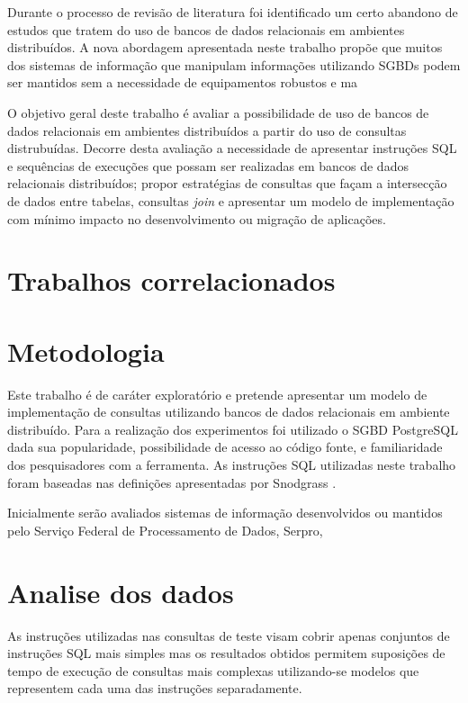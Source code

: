 \documentclass[12pt, a4paper]{article}
\begin{document}
Durante o processo de revisão de literatura foi identificado um certo abandono de estudos que tratem
do uso de bancos de dados relacionais em ambientes distribuídos. A nova abordagem apresentada neste
trabalho propõe que muitos dos sistemas de informação que manipulam informações utilizando SGBDs podem
ser mantidos sem a necessidade de equipamentos robustos e ma

O objetivo geral deste trabalho é avaliar a possibilidade de uso de bancos de dados relacionais em ambientes distribuídos a 
partir do uso de consultas distrubuídas. Decorre desta avaliação a necessidade de apresentar instruções SQL e 
sequências de execuções que possam ser realizadas em bancos de dados relacionais distribuídos; propor estratégias 
de consultas que façam a intersecção de dados entre tabelas, consultas \textit{join} e apresentar
um modelo de implementação com mínimo impacto no desenvolvimento ou migração de aplicações.



\section{Trabalhos correlacionados}

\section{Metodologia}

Este trabalho é de caráter exploratório e pretende apresentar um modelo de implementação de consultas
utilizando bancos de dados relacionais em ambiente distribuído. Para a realização dos experimentos
foi utilizado o SGBD PostgreSQL dada sua popularidade, possibilidade de acesso ao código fonte, e 
familiaridade dos pesquisadores com a ferramenta. As instruções SQL utilizadas neste trabalho foram
baseadas nas definições apresentadas por Snodgrass \cite{snodgrass1994tsql2}.

Inicialmente serão avaliados sistemas de informação desenvolvidos ou mantidos pelo Serviço Federal de
Processamento de Dados, Serpro, 



\section{Analise dos dados}

As instruções utilizadas nas consultas de teste visam cobrir apenas conjuntos de instruções SQL mais simples
mas os resultados obtidos permitem suposições de tempo de execução de consultas mais complexas utilizando-se
modelos que representem cada uma das instruções separadamente.
\end{document}
